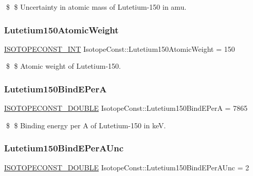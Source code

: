 \$ \$ Uncertainty in atomic mass of Lutetium-\/150 in amu. \mbox{\label{group___isotope_const-_lutetium-_lu150_ga633669483099b9b6863d16f018193497}} 
\subsubsection{\texorpdfstring{Lutetium150\+Atomic\+Weight}{Lutetium150AtomicWeight}}
{\footnotesize\ttfamily \mbox{\hyperlink{group___isotope_const-_macros_ga5f18360b3e99483a35c32d789e62621c}{I\+S\+O\+T\+O\+P\+E\+C\+O\+N\+S\+T\+\_\+\+I\+NT}} Isotope\+Const\+::\+Lutetium150\+Atomic\+Weight = 150}

\$ \$ Atomic weight of Lutetium-\/150. \mbox{\label{group___isotope_const-_lutetium-_lu150_ga0d518f995e20f69c696435dc668bf9b2}} 
\subsubsection{\texorpdfstring{Lutetium150\+Bind\+E\+PerA}{Lutetium150BindEPerA}}
{\footnotesize\ttfamily \mbox{\hyperlink{group___isotope_const-_macros_ga8f45a7272ce02c0b4c65c44636ed719a}{I\+S\+O\+T\+O\+P\+E\+C\+O\+N\+S\+T\+\_\+\+D\+O\+U\+B\+LE}} Isotope\+Const\+::\+Lutetium150\+Bind\+E\+PerA = 7865}

\$ \$ Binding energy per A of Lutetium-\/150 in keV. \mbox{\label{group___isotope_const-_lutetium-_lu150_ga760446fc5b38b76a85535f1b2e7e7898}} 
\subsubsection{\texorpdfstring{Lutetium150\+Bind\+E\+Per\+A\+Unc}{Lutetium150BindEPerAUnc}}
{\footnotesize\ttfamily \mbox{\hyperlink{group___isotope_const-_macros_ga8f45a7272ce02c0b4c65c44636ed719a}{I\+S\+O\+T\+O\+P\+E\+C\+O\+N\+S\+T\+\_\+\+D\+O\+U\+B\+LE}} Isotope\+Const\+::\+Lutetium150\+Bind\+E\+Per\+A\+Unc = 2}

